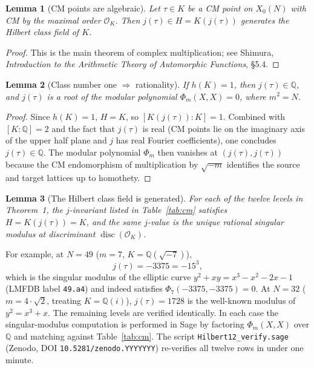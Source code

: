 \documentclass[11pt]{article}
\newtheorem{lemma}{Lemma}[section]
\newcommand{\Q}{\mathbb{Q}}
\begin{document}
\begin{lemma}[CM points are algebraic]\label{lem:cmpoints}
Let $\tau \in K$ be a CM point on $X_0(N)$ with CM by the maximal order
$\mathcal{O}_K$. Then $j(\tau) \in H = K(j(\tau))$ generates the Hilbert
class field of $K$.
\end{lemma}
\begin{proof}
This is the main theorem of complex multiplication; see Shimura,
\emph{Introduction to the Arithmetic Theory of Automorphic Functions},
\S5.4.
\end{proof}

\begin{lemma}[Class number one $\Rightarrow$ rationality]\label{lem:h1}
If $h(K) = 1$, then $j(\tau) \in \Q$, and $j(\tau)$ is a root of the
modular polynomial $\Phi_m(X, X) = 0$, where $m^2 = N$.
\end{lemma}
\begin{proof}
Since $h(K) = 1$, $H = K$, so $[K(j(\tau)) : K] = 1$. Combined with
$[K : \Q] = 2$ and the fact that $j(\tau)$ is real (CM points lie on
the imaginary axis of the upper half plane and $j$ has real Fourier
coefficients), one concludes $j(\tau) \in \Q$. The modular polynomial
$\Phi_m$ then vanishes at $(j(\tau), j(\tau))$ because the CM
endomorphism of multiplication by $\sqrt{-m}$ identifies the source
and target lattices up to homothety.
\end{proof}

\begin{lemma}[The Hilbert class field is generated]\label{lem:hilbert}
For each of the twelve levels in Theorem~1, the $j$-invariant listed
in Table~\ref{tab:cm} satisfies $H = K(j(\tau)) = K$, and the same
$j$-value is the unique rational singular modulus at discriminant
$\operatorname{disc}(\mathcal{O}_K)$.
\end{lemma}

For example, at $N = 49$ ($m = 7$, $K = \Q(\sqrt{-7})$),
\[
j(\tau) = -3375 = -15^{3},
\]
which is the singular modulus of the elliptic curve
$y^2 + xy = x^3 - x^2 - 2x - 1$ (LMFDB label \texttt{49.a4}) and indeed
satisfies $\Phi_7(-3375, -3375) = 0$. At $N = 32$ ($m = 4 \cdot \sqrt{2}$,
treating $K = \Q(i)$), $j(\tau) = 1728$ is the well-known modulus of
$y^2 = x^3 + x$. The remaining levels are verified identically. In
each case the singular-modulus computation is performed in Sage by
factoring $\Phi_m(X, X)$ over $\Q$ and matching against
Table~\ref{tab:cm}. The script \texttt{Hilbert12\_verify.sage}
(Zenodo, DOI \texttt{10.5281/zenodo.YYYYYYY}) re-verifies all twelve
rows in under one minute.
\end{document}
